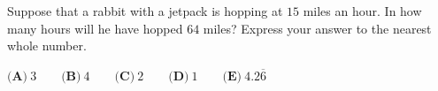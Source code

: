 Suppose that a rabbit with a jetpack is hopping at $15$ miles an hour. In how many hours will he have hopped $64$ miles? Express your answer to the nearest whole number.

$\textbf{(A)}~3\qquad\textbf{(B)}~4\qquad\textbf{(C)}~2\qquad\textbf{(D)}~1\qquad\textbf{(E)}~4.2\overline{6}\qquad$
